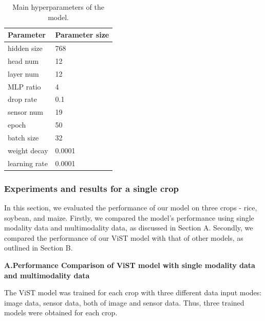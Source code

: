 \documentclass[acmsmall,manuscript, screen, review]{acmart}
\begin{document}
\begin{table}[htbp]
  \centering
  \caption{Main hyperparameters of the model.}
  \begin{tabular}{ll}
    \toprule
    Parameter     & \multicolumn{1}{l}{Parameter size} \\
    \midrule
    hidden size   & 768                                \\
    head num      & 12                                 \\
    layer num     & 12                                 \\
    MLP ratio     & 4                                  \\
    drop rate     & 0.1                                \\
    sensor num    & 19                                 \\
    epoch         & 50                                 \\
    batch size    & 32                                 \\
    weight decay  & 0.0001                             \\
    learning rate & 0.0001                             \\

    \bottomrule
  \end{tabular}%
  \label{tab:hyperparameters}%
\end{table}%

\subsubsection{Experiments and results for a single crop}


In this section, we evaluated the performance of our model on three crops - rice, soybean, and maize. Firstly, we compared the model's performance using single modality data and multimodality data, as discussed in Section A. Secondly, we compared the performance of our ViST model with that of other models, as outlined in Section B.

\textbf{A.Performance Comparison of ViST model with single modality data and multimodality data}	

The ViST model was trained for each crop with three different data input modes: image data, sensor data, both of image and sensor data. Thus, three trained models were obtained for each crop.
\end{document}
